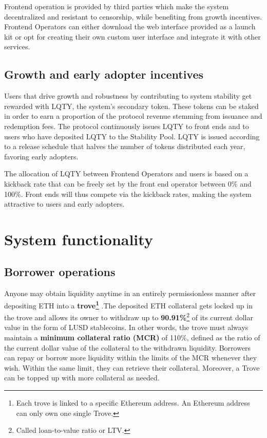 \documentclass{article}
\begin{document}
Frontend operation is provided by third parties which make the system decentralized and resistant to censorship, while benefiting from growth incentives. Frontend Operators can either download the web interface provided as a launch kit or opt for creating their own custom user interface and integrate it with other services.

\subsection{Growth and early adopter incentives}
Users that drive growth and robustness by contributing to system stability get rewarded with LQTY, the system's secondary token. These tokens can be staked in order to earn a proportion of the protocol revenue stemming from issuance and redemption fees. The protocol continuously issues LQTY to front ends and to users who have deposited LQTY to the Stability Pool. LQTY is issued according to a release schedule that halves the number of tokens distributed each year, favoring early adopters.

The allocation of LQTY between Frontend Operators and users is based on a kickback rate that can be freely set by the front end operator between 0\% and 100\%. Front ends will thus compete via the kickback rates, making the system attractive to users and early adopters.

\section{System functionality}
\subsection{Borrower operations }
Anyone may obtain liquidity anytime in an entirely permissionless manner after depositing ETH into a \textbf{trove\footnote{Each trove is linked to a specific Ethereum address. An Ethereum address can only own one single Trove.} }.The deposited ETH collateral gets locked up in the trove and allows its owner to withdraw up to \textbf{90.91\%}\footnote{Called loan-to-value ratio or LTV.} of its current dollar value in the form of LUSD stablecoins. In other words, the trove must always maintain a \textbf{minimum collateral ratio (MCR)} of 110\%, defined as the ratio of the current dollar value of the collateral to the withdrawn liquidity. Borrowers can repay or borrow more liquidity within the limits of the MCR whenever they wish. Within the same limit, they can retrieve their collateral. Moreover, a Trove can be topped up with more collateral as needed. \\
\end{document}
